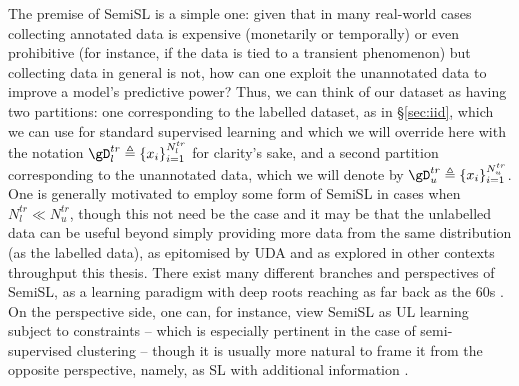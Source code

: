 The premise of \ac{SemiSL} is a simple one: given that in many real-world cases collecting annotated
data is expensive (monetarily or temporally) or even prohibitive (for instance, if the data is tied
to a transient phenomenon) but collecting data in general is not, how can one exploit the
unannotated data to improve a model's predictive power?
%
Thus, we can think of our dataset as having two partitions: one corresponding to the labelled
dataset, as in \S\ref{sec:iid}, which we can use for standard supervised learning and which we will
override here with the notation \( \gD^{tr}_l \triangleq \{ x_i \}_{i=1}^{N^{tr}_l} \) for
clarity's sake, and a second partition corresponding to the unannotated data, which we will denote
by \( \gD^{tr}_u  \triangleq \{ x_i \}_{i=1}^{N^{tr}_u} \).
%
One is generally motivated to employ some form of \ac{SemiSL} in cases when \( N^{tr}_l \ll
N^{tr}_u \), though this not need be the case and it may be that the unlabelled data can be useful
beyond simply providing more data from the same distribution (as the labelled data), as epitomised
by \ac{UDA} and as explored in other contexts throughput this thesis.
%
There exist many different branches and perspectives of \ac{SemiSL}, as a learning paradigm with deep
roots reaching as far back as the 60s \citep{scudder1965probability, fralick1967learning}. 
%
On the perspective side, one can, for instance, view \ac{SemiSL} as \ac{UL} learning subject to
constraints -- which is especially pertinent in the case of semi-supervised clustering
\citep{bair2013semi} -- though it is usually more natural to frame it from the opposite
perspective, namely, as \ac{SL} with additional information \citep{chapelle2009semi}.

